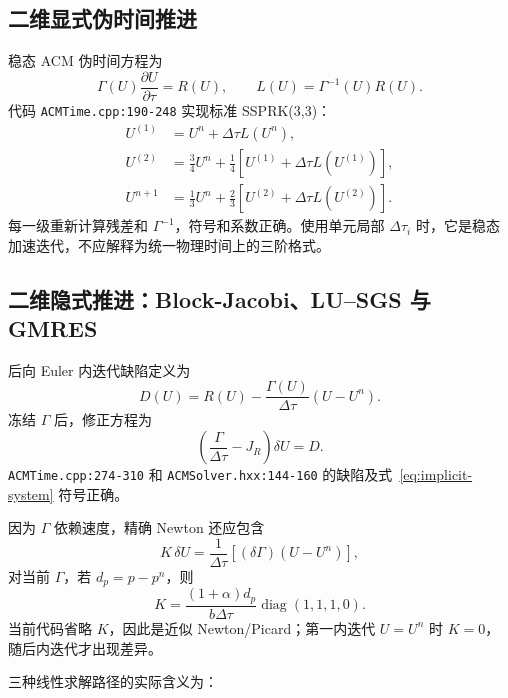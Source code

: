 \documentclass[UTF8,11pt,a4paper]{ctexart}
\newcommand{\code}[1]{\nolinkurl{#1}}
\begin{document}
\subsection{二维显式伪时间推进}

稳态 ACM 伪时间方程为
\begin{equation}
 \Gamma(U)\frac{\partial U}{\partial\tau}=R(U),\qquad
 L(U)=\Gamma^{-1}(U)R(U).
\end{equation}
代码 \code{ACMTime.cpp:190-248} 实现标准 SSPRK(3,3)：
\begin{align}
 U^{(1)}&=U^n+\Delta\tau L(U^n),\\
 U^{(2)}&=\tfrac34U^n+\tfrac14\left[U^{(1)}+\Delta\tau L(U^{(1)})\right],\\
 U^{n+1}&=\tfrac13U^n+\tfrac23\left[U^{(2)}+\Delta\tau L(U^{(2)})\right].
\end{align}
每一级重新计算残差和 $\Gamma^{-1}$，符号和系数正确。使用单元局部 $\Delta\tau_i$ 时，它是稳态加速迭代，不应解释为统一物理时间上的三阶格式。

\subsection{二维隐式推进：Block-Jacobi、LU--SGS 与 GMRES}

后向 Euler 内迭代缺陷定义为
\begin{equation}
 D(U)=R(U)-\frac{\Gamma(U)}{\Delta\tau}(U-U^n).
 \label{eq:implicit-defect}
\end{equation}
冻结 $\Gamma$ 后，修正方程为
\begin{equation}
 \left(\frac{\Gamma}{\Delta\tau}-J_R\right)\delta U=D.
 \label{eq:implicit-system}
\end{equation}
\code{ACMTime.cpp:274-310} 和 \code{ACMSolver.hxx:144-160} 的缺陷及式~\eqref{eq:implicit-system} 符号正确。

因为 $\Gamma$ 依赖速度，精确 Newton 还应包含
\begin{equation}
 K\,\delta U=\frac{1}{\Delta\tau}
 \left[(\delta\Gamma)(U-U^n)\right],
\end{equation}
对当前 $\Gamma$，若 $d_p=p-p^n$，则
\begin{equation}
 K=\frac{(1+\alpha)d_p}{b\Delta\tau}
 \operatorname{diag}(1,1,1,0).
\end{equation}
当前代码省略 $K$，因此是近似 Newton/Picard；第一内迭代 $U=U^n$ 时 $K=0$，随后内迭代才出现差异。

三种线性求解路径的实际含义为：
\end{document}
